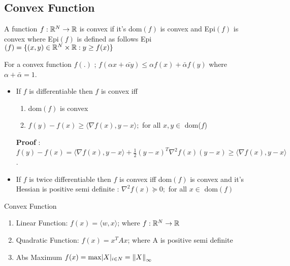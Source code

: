 \documentclass[a4paper,english,12pt]{article}
\begin{document}
{\subsection{Convex Function}
\begin{defn}
A function $f:\mathbb{R}^N\to\mathbb{R}$ is convex if it's dom$(f)$ is convex and Epi$(f)$ is convex where Epi$(f)$ is defined as follows 
Epi$(f) = \{(x,y) \in \mathbb{R}^N \times \mathbb{R}: y \geq f(x)\}$
\end{defn}
\begin{note}
	For a convex function $f(.)$ ; $f(\alpha x + \bar{\alpha y} ) \leq \alpha f(x) + \bar{\alpha} f(y)$ where $\alpha + \bar{\alpha} =1$.\\	
	\begin{itemize}
		\item If $f$ is differentiable then $f$ is convex iff 
		\begin{enumerate}
			\item dom$(f)$ is convex
			\item $f(y) -f(x) \geq \langle\nabla f(x), y-x\rangle; $ for all $ x,y \in$ dom($f$)
		\end{enumerate}	 
		\textbf{Proof} : $ f(y) - f(x) = \langle\nabla f(x) , y-x\rangle + \frac{1}{2}(y-x)^T \nabla^2 f(x) (y-x) \geq \langle\nabla f(x) , y-x\rangle$.
		\item If $f$ is twice differentiable then $f$ is convex iff dom$(f)$ is convex and it's Hessian is positive semi definite : $\nabla^2 f(x)\succeq 0; $ for all $ x \in$ dom$(f)$
	\end{itemize}
	
\end{note}

\begin{exmp}{Convex Function}
	\begin{enumerate}
		\item Linear Function:  $f(x) = \langle w,x\rangle$; where $f:\mathbb{R}^N\to\mathbb{R}$
		\item Quadratic Function: $f(x) = x^TAx$; where A is positive semi definite 
		\item Abs Maximum $f(x) = \max \lvert X\rvert_{i \in N} = \left\lVert X\right\rVert_\infty$		
	\end{enumerate}

\end{exmp}

}
\end{document}
